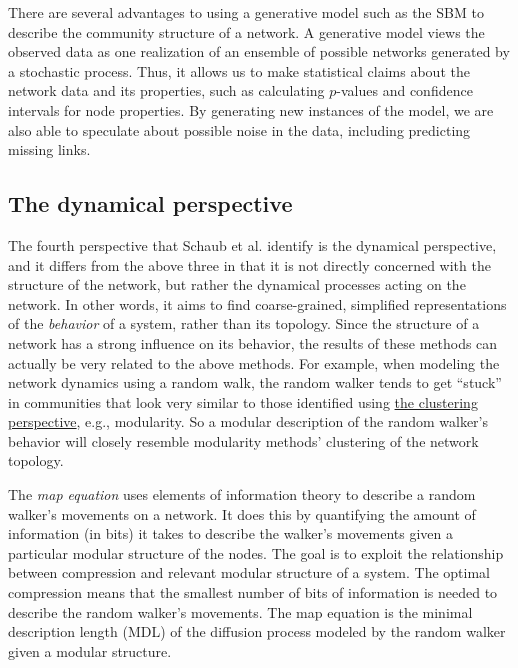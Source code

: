 There are several advantages to using a generative model such as the SBM
to describe the community structure of a network. A generative model
views the observed data as one realization of an ensemble of possible
networks generated by a stochastic process. Thus, it allows us to make
statistical claims about the network data and its properties, such as
calculating \(p\)-values and confidence intervals for node properties.
By generating new instances of the model, we are also able to speculate
about possible noise in the data, including predicting missing links.

\hypertarget{the-dynamical-perspective}{\subsection{The dynamical
perspective}\label{the-dynamical-perspective}}

The fourth perspective that Schaub et al. identify is the dynamical
perspective, and it differs from the above three in that it is not
directly concerned with the structure of the network, but rather the
dynamical processes acting on the network. In other words, it aims to
find coarse-grained, simplified representations of the \emph{behavior}
of a system, rather than its topology. Since the structure of a network
has a strong influence on its behavior, the results of these methods can
actually be very related to the above methods. For example, when
modeling the network dynamics using a random walk, the random walker
tends to get ``stuck'' in communities that look very similar to those
identified using \protect\hyperlink{the-clustering-perspective}{the
clustering perspective}, e.g., modularity. So a modular description of
the random walker's behavior will closely resemble modularity methods'
clustering of the network topology.

The \emph{map equation} uses elements of information theory to describe
a random walker's movements on a network. It does this by quantifying
the amount of information (in bits) it takes to describe the walker's
movements given a particular modular structure of the nodes. The goal is
to exploit the relationship between compression and relevant modular
structure of a system. The optimal compression means that the smallest
number of bits of information is needed to describe the random walker's
movements. The map equation is the minimal description length (MDL) of
the diffusion process modeled by the random walker given a modular
structure.

